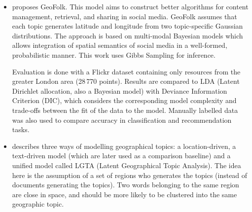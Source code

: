 \begin{itemize}
\item \textcite{Sizov2010} proposes GeoFolk. This model aims to construct better algorithms for content management, retrieval, and sharing in social media. GeoFolk assumes that each topic generates latitude and longitude from two topic-specific Gaussian distributions. The approach is based on multi-modal Bayesian models which allows integration of spatial semantics of social media in a well-formed, probabilistic manner. This work uses Gibbs Sampling for inference.
 
Evaluation is done with a Flickr dataset containing only resources from the greater London area (28\,770 points). Results are compared to LDA (Latent Dirichlet allocation, also a Bayesian model) with Deviance Information Criterion (DIC), which considers  the corresponding model complexity and trade-offs between the fit of the data to the model. Manually labelled data was also used to compare accuracy in classification and recommendation tasks. 

\item \textcite{Yin2011} describes three ways of modelling geographical topics: a location-driven, a text-driven model (which are later used as a comparison baseline) and a unified model called LGTA (Latent Geographical Topic Analysis). The idea here is the assumption of a set of regions who generates the topics (instead of documents generating the topics). Two words belonging to the same region are close in space, and should be more likely to be clustered into the same geographic topic.





\end{itemize}
